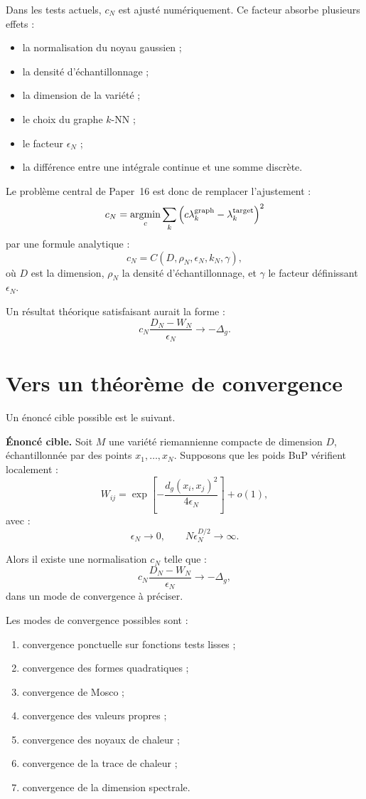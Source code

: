 \documentclass[11pt,a4paper]{article}
\begin{document}
Dans les tests actuels, \(c_N\) est ajusté numériquement. Ce facteur absorbe
plusieurs effets :

\begin{itemize}
    \item la normalisation du noyau gaussien ;
    \item la densité d'échantillonnage ;
    \item la dimension de la variété ;
    \item le choix du graphe \(k\)-NN ;
    \item le facteur \(\epsilon_N\) ;
    \item la différence entre une intégrale continue et une somme discrète.
\end{itemize}

Le problème central de Paper~16 est donc de remplacer l'ajustement :
\[
c_N
=
\operatorname*{argmin}_c
\sum_k
\left(
c\lambda_k^{\rm graph}
-
\lambda_k^{\rm target}
\right)^2
\]
par une formule analytique :
\[
c_N=C(D,\rho_N,\epsilon_N,k_N,\gamma),
\]
où \(D\) est la dimension, \(\rho_N\) la densité d'échantillonnage, et
\(\gamma\) le facteur définissant \(\epsilon_N\).

Un résultat théorique satisfaisant aurait la forme :
\[
c_N\frac{D_N-W_N}{\epsilon_N}
\longrightarrow
-\Delta_g.
\]

\section{Vers un théorème de convergence}

Un énoncé cible possible est le suivant.

\medskip

\noindent
\textbf{Énoncé cible.}
Soit \(M\) une variété riemannienne compacte de dimension \(D\), échantillonnée
par des points \(x_1,\ldots,x_N\). Supposons que les poids BuP vérifient
localement :
\[
W_{ij}
=
\exp\left[
-\frac{d_g(x_i,x_j)^2}{4\epsilon_N}
\right]
+
o(1),
\]
avec :
\[
\epsilon_N\to0,
\qquad
N\epsilon_N^{D/2}\to\infty.
\]

Alors il existe une normalisation \(c_N\) telle que :
\[
c_N\frac{D_N-W_N}{\epsilon_N}
\longrightarrow
-\Delta_g,
\]
dans un mode de convergence à préciser.

\medskip

Les modes de convergence possibles sont :

\begin{enumerate}
    \item convergence ponctuelle sur fonctions tests lisses ;
    \item convergence des formes quadratiques ;
    \item convergence de Mosco ;
    \item convergence des valeurs propres ;
    \item convergence des noyaux de chaleur ;
    \item convergence de la trace de chaleur ;
    \item convergence de la dimension spectrale.
\end{enumerate}
\end{document}
